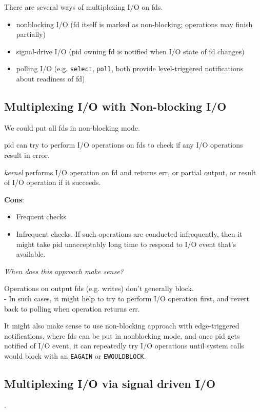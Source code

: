 \documentclass[10pt]{amsart}
\begin{document}
There are several ways of multiplexing I/O on fds.
\begin{itemize}
	\item nonblocking I/O (fd itself is marked as non-blocking; operations may finish partially)
	\item signal-drive I/O (pid owning fd is notified when I/O state of fd changes)
	\item polling I/O (e.g. \texttt{select}, \texttt{poll}, both provide level-triggered notifications about readiness of fd)
\end{itemize}

\subsection{Multiplexing I/O with Non-blocking I/O}

We could put all fds in non-blocking mode.

pid can try to perform I/O operations on fds to check if any I/O operations result in error.

\emph{kernel} performs I/O operation on fd and returns err, or partial output, or result of I/O operation if it succeeds.

\textbf{Cons}:
\begin{itemize}
	\item Frequent checks
	\item Infrequent checks. If such operations are conducted infrequently, then it might take pid unacceptably long time to respond to I/O event that's available.
\end{itemize}

\emph{When does this approach make sense?}

Operations on output fds (e.g. writes) don't generally block.  \\
- In such cases, it might help to try to perform I/O operation first, and revert back to polling when operation returns err.

It might also make sense to use non-blocking approach with edge-triggered notifications, where fds can be put in nonblocking mode, and once pid gets notified of I/O event, it can repeatedly try I/O operations until system calls would block with an \texttt{EAGAIN} or \texttt{EWOULDBLOCK}. 

\subsection{Multiplexing I/O via signal driven I/O}.
\end{document}
